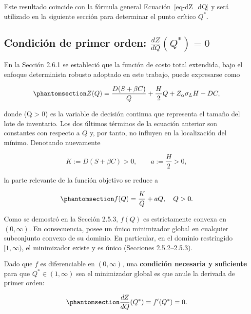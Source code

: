 \documentclass[
  spanish,
  us-letterpaper,
  DIV=11,
  numbers=noendperiod]{scrreprt}
\numberwithin{equation}{section}
\begin{document}
Este resultado coincide con la fórmula general Ecuación~\ref{eq-dZ_dQ} y
será utilizado en la siguiente sección para determinar el punto crítico
\(Q^*\).

\subsection{\texorpdfstring{Condición de primer orden:
\(\frac{dZ}{dQ}(Q^*) = 0\)}{Condición de primer orden: \textbackslash frac\{dZ\}\{dQ\}(Q\^{}*) = 0}}\label{condiciuxf3n-de-primer-orden-fracdzdqq-0}

En la Sección 2.6.1 se estableció que la función de costo total
extendida, bajo el enfoque determinista robusto adoptado en este
trabajo, puede expresarse como

\begin{equation}\phantomsection\label{eq-ZQ_total_26_2}{
Z(Q) = \frac{D(S + \beta C)}{Q} + \frac{H}{2} Q + Z_\alpha \sigma_L H + D C,
}\end{equation}

donde (Q \textgreater{} 0) es la variable de decisión continua que
representa el tamaño del lote de inventario. Los dos últimos términos de
la ecuación anterior son constantes con respecto a \(Q\) y, por tanto,
no influyen en la localización del mínimo. Denotando nuevamente

\[
K := D(S + \beta C) > 0, \qquad a := \frac{H}{2} > 0,
\]

la parte relevante de la función objetivo se reduce a

\begin{equation}\phantomsection\label{eq-fQ_26_2}{
f(Q) = \frac{K}{Q} + a Q, \quad Q > 0.
}\end{equation}

Como se demostró en la Sección 2.5.3, \(f(Q)\) es estrictamente convexa
en \((0, \infty)\). En consecuencia, posee un único minimizador global
en cualquier subconjunto convexo de su dominio. En particular, en el
dominio restringido \([1, \infty)\), el minimizador existe y es único
(Secciones 2.5.2--2.5.3).

Dado que \(f\) es diferenciable en \((0, \infty)\), una
\textbf{condición necesaria y suficiente} para que
\(Q^* \in (1, \infty)\) sea el minimizador global es que anule la
derivada de primer orden:

\begin{equation}\phantomsection\label{eq-cond_primer_orden_26}{
\frac{dZ}{dQ}(Q^*) = f'(Q^*) = 0.
}\end{equation}
\end{document}
